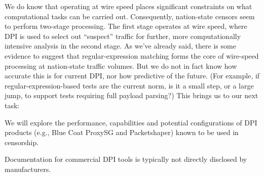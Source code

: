 We do know that operating at wire speed places significant constraints on what
computational tasks can be carried out.  Consequently, nation-state
censors seem to perform two-stage processing.  The first stage
operates at wire speed, where DPI is used to select out ``suspect''
traffic for further, more computationally intensive analysis in the
second stage.  As we've already said, there is some evidence to
suggest that regular-expression matching
forms the core of wire-speed processing at nation-state traffic
volumes.  But we do not in fact know how accurate this is for
current DPI, nor how predictive of the future.  (For example, if
regular-expression-based tests are the current norm, is it a small
step, or a large jump, to support tests requiring full payload
parsing?) This brings us to our next task:
%  
\begin{task} 
\label{task:dpi-study}
We will explore the performance, capabilities and
  potential configurations of DPI products (e.g., Blue Coat ProxySG
  and Packetshaper) known to be used in censorship. 
\end{task}
\noindent
Documentation for commercial DPI tools is typically not
directly disclosed by manufacturers.  

